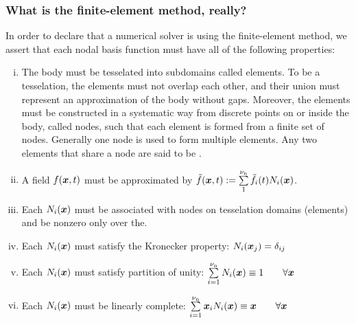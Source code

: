 \subsubsection{What is the finite-element method, really?}
In order to declare that a numerical solver is using the finite-element method, we assert that each nodal basis function must have all of the following properties:
\begin{enumerate}[i.]
  \item The body must be tesselated into subdomains called elements. To be a tesselation, the elements must not overlap each other, and their union must represent an approximation of the body without gaps.  Moreover, the elements must be constructed in a systematic way from discrete points on or inside the body, called nodes, such that each element is formed from a finite set of nodes. Generally one node is used to form multiple elements. Any two elements that share a node are said to be .
  \item A field $f(\bm{x},{t})$ must be approximated by $\tilde{f}(\bm{x},{t}):=\sum\limits_1^{\nu_\text{n}} \tilde{f}_i({t}) {N}_i(\bm{x})$.
  \item Each ${N}_i(\bm{x})$ must be associated with nodes on tesselation domains (elements) and be nonzero only over the.
  \item Each ${N}_i(\bm{x})$ must satisfy the Kronecker property:  ${N}_i(\bm{x}_j)=\delta_{ij}$
  \item Each ${N}_i(\bm{x})$ must satisfy partition of unity: $\sum\limits_{i=1}^{{\nu_\text{n}}} {N}_i(\bm{x})\equiv 1\qquad\forall\bm{x}$
  \item Each ${N}_i(\bm{x})$ must be linearly complete: $\sum\limits_{i=1}^{{\nu_\text{n}}} \bm{x}_i{N}_i(\bm{x})\equiv \bm{x}\qquad\forall\bm{x}$
\end{enumerate}














